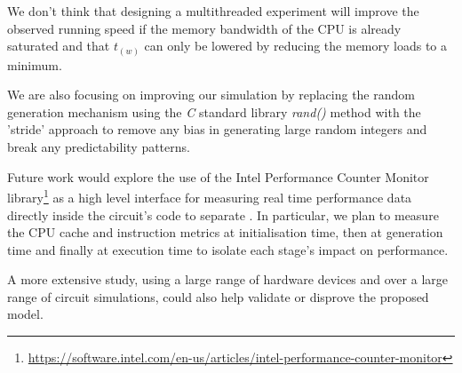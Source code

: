\par
We don't think that designing a multithreaded experiment
will improve the observed running speed if the memory bandwidth of the
CPU is already saturated and that $t_(w)$ can only be lowered by reducing the memory loads to a minimum.
\par
We are also focusing on improving our simulation by replacing the random generation
mechanism using the \textit{C} standard library \textit{rand()} method with the
’stride’ approach\cite{stride} to remove any bias in generating large random
integers and break any predictability patterns.
\par
Future work would explore the use of the Intel Performance Counter Monitor
library\footnote{\url{https://software.intel.com/en-us/articles/intel-performance-counter-monitor}}
as a high level interface for measuring real time performance data directly
inside the circuit's code to separate . In particular, we plan to measure the
CPU cache and instruction metrics at initialisation time, then at generation
time and finally at execution time to isolate each stage's impact on performance.
\par
A more extensive study, using a large range of hardware devices and over
a large range of circuit simulations, could also help validate or disprove the
proposed model.
